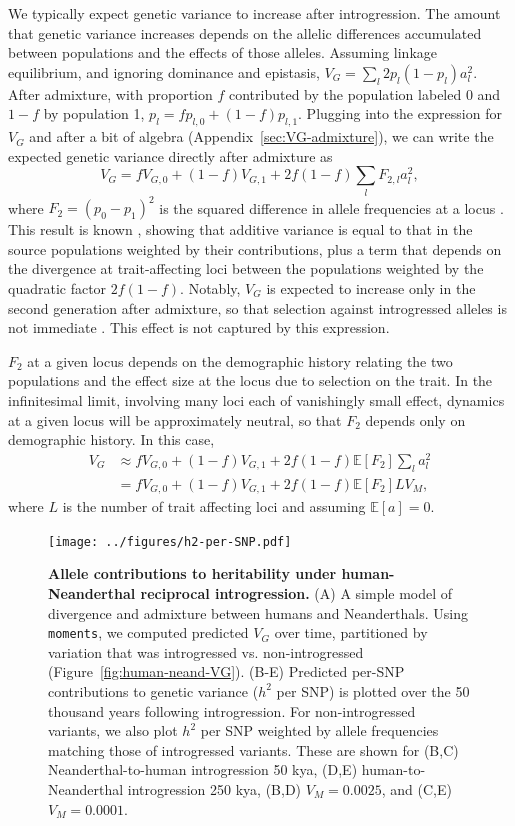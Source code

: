 \documentclass{article}
\newcommand{\E}{\mathbb{E}}
\newcommand{\moments}{\texttt{moments}\xspace}
\begin{document}
We typically expect genetic variance to increase after introgression. The
amount that genetic variance increases depends on the allelic differences
accumulated between populations and the effects of those alleles. Assuming
linkage equilibrium, and ignoring dominance and epistasis, \(V_G=\sum_l
2p_l(1-p_l)a_l^2\). After admixture, with proportion $f$ contributed by the
population labeled 0 and $1-f$ by population 1, \(p_l = fp_{l,0} +
(1-f)p_{l,1}\). Plugging into the expression for $V_G$ and after a bit of
algebra (Appendix~\ref{sec:VG-admixture}), we can write the expected genetic
variance directly after admixture as
\[V_G = fV_{G,0} + (1-f) V_{G,1} + 2f(1-f)\sum_l F_{2,l} a_l^2,\]
where $F_2 = (p_0 - p_1)^2$ is the squared difference in allele frequencies at
a locus \citep{peter2016admixture}. This result is known
\citep[e.g.,][]{tufto2000quantitative}, showing that additive variance is equal
to that in the source populations weighted by their contributions, plus a term
that depends on the divergence at trait-affecting loci between the populations
weighted by the quadratic factor $2f(1-f)$. Notably, $V_G$ is expected to
increase only in the second generation after admixture, so that selection
against introgressed alleles is not immediate \citep{veller2024stabilizing}.
This effect is not captured by this expression.

$F_2$ at a given locus depends on the demographic history
relating the two populations and the effect size at the locus due to selection
on the trait. In the infinitesimal limit, involving many loci each of
vanishingly small effect, dynamics at a given locus will be approximately
neutral, so that $F_2$ depends only on demographic history. In this case,
\begin{align} \label{eq:VG-admixture}
    V_G & \approx f V_{G,0} + (1-f) V_{G,1} + 2f(1-f)\mathbb{E}[F_2] \sum_l a_l^2 \\
    \nonumber
    & = f V_{G,0} + (1-f) V_{G,1} + 2f(1-f)\mathbb{E}[F_2] L V_M,
\end{align}
where $L$ is the number of trait affecting loci and assuming $\E[a]=0$.


\begin{figure}[ht!]
    \centering
    \texttt{[image: ../figures/h2-per-SNP.pdf]}
    \caption{
        \textbf{Allele contributions to heritability under human-Neanderthal
        reciprocal introgression.}
        (A) A simple model of divergence and admixture between humans and
        Neanderthals. Using \moments, we computed predicted $V_G$ over time,
        partitioned by variation that was introgressed vs. non-introgressed
        (Figure~\ref{fig:human-neand-VG}).
        (B-E) Predicted per-SNP contributions to genetic variance ($h^2$ per
        SNP) is plotted over the 50 thousand years following introgression.
        For non-introgressed variants, we also plot $h^2$ per SNP weighted by
        allele frequencies matching those of introgressed variants. These
        are shown for (B,C) Neanderthal-to-human introgression 50 kya,
        (D,E) human-to-Neanderthal introgression 250 kya, (B,D) $V_M=0.0025$,
        and (C,E) $V_M=0.0001$.
    }
    \label{fig:human-neand-h2}
\end{figure}
\end{document}
